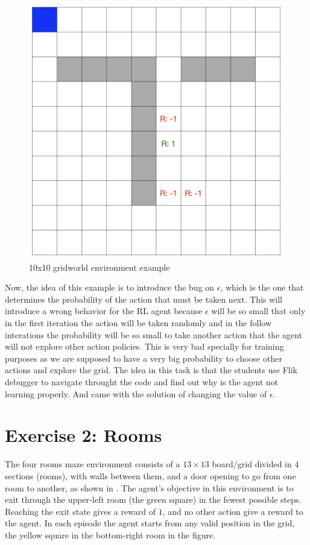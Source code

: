 \begin{figure}[h]
  \centering
  \includegraphics[width=0.5\columnwidth]{figures/gridworld.png}
  \caption{10x10 gridworld environment example}
  \label{fig:gridworld}
\end{figure}

Now, the idea of this example is to introduce the bug on $\epsilon$, which is the one that determines the 
probability of the action that must be taken next. This will introduce a wrong behavior for the \ac{RL} 
agent because $\epsilon$ will be so small that only in the first iteration the action will be taken randomly 
and in the follow interations the probability will be so small to take another action that the agent will not explore
other action policies. This is very bad specially for training purposes as we are supposed to have a very big 
probability to choose other actions and explore the grid. The idea in this task is that the students use 
Flik debugger to navigate throught the code and find out why is the agent not learning properly. And came 
with the solution of changing the value of $\epsilon$. 

\section{Exercise 2: Rooms}

The four rooms maze environment consists of a $13\times 13$ board/grid divided in $4$ sections 
(\ie rooms), with walls between them, and a door opening to go from one room to another, as shown 
in . The agent's objective in this environment is to exit through the upper-left room 
(the green square) in the fewest possible steps. Reaching the exit state gives a reward of $1$, and no 
other action give a reward to the agent. In each episode the agent starts from any valid position in the 
grid, \eg the yellow square in the bottom-right room in the figure. 

